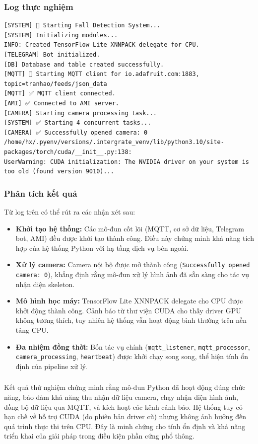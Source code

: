 \subsubsection*{Log thực nghiệm}
\begin{verbatim}
[SYSTEM] 🚀 Starting Fall Detection System...
[SYSTEM] Initializing modules...
INFO: Created TensorFlow Lite XNNPACK delegate for CPU.
[TELEGRAM] Bot initialized.
[DB] Database and table created successfully.
[MQTT] 🔄 Starting MQTT client for io.adafruit.com:1883, topic=tranhao/feeds/json_data
[MQTT] ✅ MQTT client connected.
[AMI] ✅ Connected to AMI server.
[CAMERA] Starting camera processing task...
[SYSTEM] ✅ Starting 4 concurrent tasks...
[CAMERA] ✅ Successfully opened camera: 0
/home/hx/.pyenv/versions/.intergrate_venv/lib/python3.10/site-packages/torch/cuda/__init__.py:138:
UserWarning: CUDA initialization: The NVIDIA driver on your system is too old (found version 9010)...
\end{verbatim}

\subsubsection*{Phân tích kết quả}
Từ log trên có thể rút ra các nhận xét sau:
\begin{itemize}
    \item \textbf{Khởi tạo hệ thống:} Các mô-đun cốt lõi (MQTT, cơ sở dữ liệu, Telegram bot, AMI) đều được khởi tạo thành công. Điều này chứng minh khả năng tích hợp của hệ thống Python với hạ tầng dịch vụ bên ngoài.
    \item \textbf{Xử lý camera:} Camera nội bộ được mở thành công (\texttt{Successfully opened camera: 0}), khẳng định rằng mô-đun xử lý hình ảnh đã sẵn sàng cho tác vụ nhận diện skeleton.
    \item \textbf{Mô hình học máy:} TensorFlow Lite XNNPACK delegate cho CPU được khởi động thành công. Cảnh báo từ thư viện CUDA cho thấy driver GPU không tương thích, tuy nhiên hệ thống vẫn hoạt động bình thường trên nền tảng CPU.
    \item \textbf{Đa nhiệm đồng thời:} Bốn tác vụ chính (\texttt{mqtt\_listener}, \texttt{mqtt\_processor}, \texttt{camera\_processing}, \texttt{heartbeat}) được khởi chạy song song, thể hiện tính ổn định của pipeline xử lý.
\end{itemize}

\subsubsection*{} 
Kết quả thử nghiệm chứng minh rằng mô-đun Python đã hoạt động đúng chức năng, bảo đảm khả năng thu nhận dữ liệu camera, chạy nhận diện hình ảnh, đồng bộ dữ liệu qua MQTT, và kích hoạt các kênh cảnh báo. Hệ thống tuy có hạn chế về hỗ trợ CUDA (do phiên bản driver cũ) nhưng không ảnh hưởng đến quá trình thực thi trên CPU. Đây là minh chứng cho tính ổn định và khả năng triển khai của giải pháp trong điều kiện phần cứng phổ thông.

